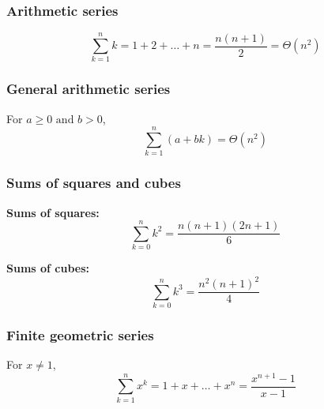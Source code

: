     \subsubsection{Arithmetic series}
        \begin{definition}
            \begin{equation}
                \sum_{k=1}^{n} k = 1 + 2 + \ldots + n  = \frac{n(n+1)}{2} = \Theta(n^2)
            \end{equation}
        \end{definition}

    \subsubsection{General arithmetic series}
        \begin{definition}
            For $a \geq 0 \text{ and } b > 0$,
            \begin{equation}
                \sum_{k=1}^{n} (a + bk) = \Theta(n^2)    
            \end{equation}
        \end{definition}

    \subsubsection{Sums of squares and cubes}
        \begin{definition}

            \textbf{Sums of squares:}
            \begin{equation}
                \sum_{k=0}^{n} k^2 = \frac{n(n+1)(2n+1)}{6}
            \end{equation}
            \vspace{1em}

            \textbf{Sums of cubes:}
            \begin{equation}
                \sum_{k=0}^{n} k^3 = \frac{n^2(n+1)^2}{4}
            \end{equation}
        \end{definition}

    \subsubsection{Finite geometric series}
        \begin{definition}
            For $x \neq 1$, 
            \begin{equation}
                \sum_{k=1}^{n} x^k = 1 + x + \ldots + x^n  = \frac{x^{n+1} - 1}{x-1} 
            \end{equation}
        \end{definition}

